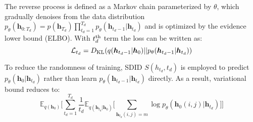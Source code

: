 \documentclass{article}
\begin{document}
The reverse process is defined as a Markov chain parameterized by $\theta$, which gradually denoises from the data distribution 
$p_{\theta}(\bm{h}_{0:T_d})=p(\bm{h}_{T_d})\prod_{t_d=1}^{T_{d}}p_{\theta}(\bm{h}_{t_d-1}|\bm{h}_{t_d})$ and is optimized by the evidence lower bound (ELBO). With $t^{{\rm{th}}}_{d}$ term the loss can be written as:
\begin{equation}
\mathcal{L}_{t_d}=D_{\rm{KL}}(q(\bm{h}_{t_d-1}|\bm{h}_0)||p_{\theta}(\bm{h}_{t_d-1}|\bm{h}_{t_d}))
\end{equation}

To reduce the randomness of training, SDID $S(h_{t_d}, t_d)$ is employed to predict $p_{\theta}(\bm{h}_{0}|\bm{h}_{t_d})$ rather than learn $p_{\theta}(\bm{h}_{t_d-1}|\bm{h}_{t_d})$ directly. As a result, variational bound reduces to:  
\begin{equation}
\mathbb E_{q(\bm{h}_{0})}\Bigg[\sum_{t_{d}=1}^{T_d}\frac{1}{t_{d}} \mathbb E_{q(\bm{h}_{t_d}|\bm{h}_0)}
\Big[\sum_{\bm{h}_{t_d}(i,j)=m}\log{p_{\theta}}(\bm{h}_0(i,j)|\bm{h}_{t_d})\Big]\Bigg]
\end{equation}
\end{document}

